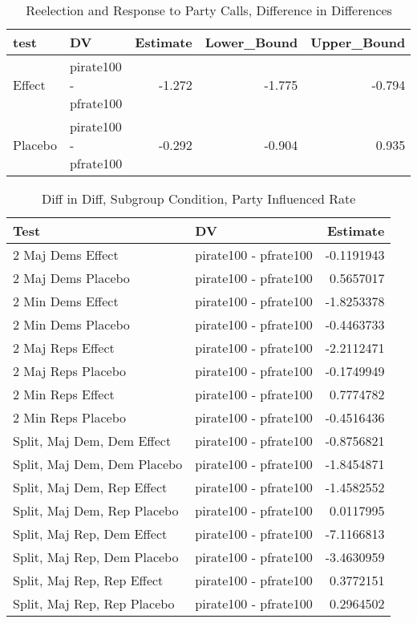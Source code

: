 \documentclass[12pt]{article}
\begin{document}
\subsection{}

\begin{table}[H]
	\centering
	\caption{Reelection and Response to Party Calls, Difference in Differences} 
	\begin{tabular}{llrrr}
		\hline
		test & DV & Estimate & Lower\_Bound & Upper\_Bound \\ 
		\hline
		Effect & pirate100 - pfrate100 & -1.272 & -1.775 & -0.794 \\ 
		Placebo & pirate100 - pfrate100 & -0.292 & -0.904 & 0.935 \\ 
		\hline
	\end{tabular}
\end{table}

\begin{table}[H]
	\centering
	\caption{Diff in Diff, Subgroup Condition, Party Influenced Rate} 
	\begin{tabular}{llr}
		\hline
		Test & DV & Estimate \\ 
		\hline
		2 Maj Dems Effect & pirate100 - pfrate100 & -0.1191943 \\ 
		2 Maj Dems Placebo & pirate100 - pfrate100 & 0.5657017 \\ 
		2 Min Dems Effect & pirate100 - pfrate100 & -1.8253378 \\ 
		2 Min Dems Placebo & pirate100 - pfrate100 & -0.4463733 \\ 
		2 Maj Reps Effect & pirate100 - pfrate100 & -2.2112471 \\ 
		2 Maj Reps Placebo & pirate100 - pfrate100 & -0.1749949 \\ 
		2 Min Reps Effect & pirate100 - pfrate100 & 0.7774782 \\ 
		2 Min Reps Placebo & pirate100 - pfrate100 & -0.4516436 \\ 
		Split, Maj Dem, Dem Effect & pirate100 - pfrate100 & -0.8756821 \\ 
		Split, Maj Dem, Dem Placebo & pirate100 - pfrate100 & -1.8454871 \\ 
		Split, Maj Dem, Rep Effect & pirate100 - pfrate100 & -1.4582552 \\ 
		Split, Maj Dem, Rep Placebo & pirate100 - pfrate100 & 0.0117995 \\ 
		Split, Maj Rep, Dem Effect & pirate100 - pfrate100 & -7.1166813 \\ 
		Split, Maj Rep, Dem Placebo & pirate100 - pfrate100 & -3.4630959 \\ 
		Split, Maj Rep, Rep Effect & pirate100 - pfrate100 & 0.3772151 \\ 
		Split, Maj Rep, Rep Placebo & pirate100 - pfrate100 & 0.2964502 \\ 
		\hline
	\end{tabular}
\end{table}
\end{document}
